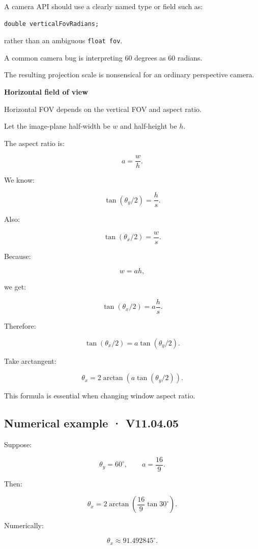 A camera API should use a clearly named type or field such as:

\begin{verbatim}
double verticalFovRadians;
\end{verbatim}

rather than an ambiguous \texttt{float\ fov}.

A common camera bug is interpreting 60 degrees as 60 radians.

The resulting projection scale is nonsensical for an ordinary perspective camera.

\textbf{Horizontal field of view}

Horizontal FOV depends on the vertical FOV and aspect ratio.

Let the image-plane half-width be \(w\) and half-height be \(h\).

The aspect ratio is:

\[
 a=\frac wh.
\]

We know:

\[
 \tan(\theta_y/2)=\frac hs.
\]

Also:

\[
 \tan(\theta_x/2)=\frac ws.
\]

Because:

\[
 w=ah,
\]

we get:

\[
 \tan(\theta_x/2) = a\frac hs.
\]

Therefore:

\[
 \boxed{ \tan(\theta_x/2) = a\tan(\theta_y/2) }.
\]

Take arctangent:

\[
 \boxed{ \theta_x= 2\arctan \left( a\tan(\theta_y/2) \right) }.
\]

This formula is essential when changing window aspect ratio.

\subsection{Numerical example · V11.04.05}\label{02-foundations-ii-ch033-numerical-example-v11.04.05}

Suppose:

\[
 \theta_y=60^\circ, \qquad a=\frac{16}{9}.
\]

Then:

\[
 \theta_x= 2\arctan \left( \frac{16}{9}\tan30^\circ \right).
\]

Numerically:

\[
 \boxed{ \theta_x\approx91.492845^\circ }.
\]

